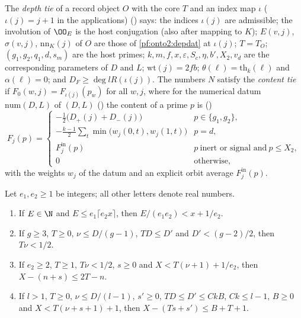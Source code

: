 \begin{definition}\label{pf:onto2:runtie}
The \emph{depth tie} of a record object $O$ with the core $T$ and an index map $\iota$ ($\iota(j)=j+1$ in the applications)
() says: the indices $\iota(j)$ are admissible; the involution of $\OO_E$ is the host
conjugation (also after mapping to $K$); $E(v,j)$, $\sigma(v,j)$, $\mathrm{nn}_K(j)$ of $O$ are those of \cref{pf:onto2:depdat} at
$\iota(j)$; $T=T_O$; $(g_1,g_2,q_1,d,s_m)$ are the host primes; $k,m,f,x,\varepsilon,S_c,\eta,b',X_2,v_d$ are the corresponding
parameters of $D$ and $L$; $\mathrm{wt}(j)=2fb$; $\theta(\ell)=\mathrm{th}_k(\ell)$ and $\alpha(\ell)=0$; and $D_F\ge\deg lR(\iota(j))$.
The numbers $N$ satisfy the \emph{content tie} if $F_0(w,j)=F_{\iota(j)}(p_w)$ for all $w,j$, where for the numerical datum
$\mathrm{num}(D,L)$ of $(D,L)$ () the content of a prime $p$ is
()
\[
F_j(p)=\begin{cases}
-\tfrac12\bigl(D_+(j)+D_-(j)\bigr)&p\in\{g_1,g_2\},\\
-\tfrac{k-1}{2}\sum_{t}\min\bigl(w_j(0,t),w_j(1,t)\bigr)&p=d,\\
F^{\mathrm{in}}_j(p)&p\ \text{inert or signal and}\ p\le X_2,\\
0&\text{otherwise},
\end{cases}
\]
with the weights $w_j$ of the datum and an explicit orbit average $F^{\mathrm{in}}_j(p)$.
\end{definition}

\begin{lemma}\label{pf:onto2:round}
Let $e_1,e_2\ge1$ be integers; all other letters denote real numbers.
\begin{enumerate}[label=(\roman*)]
\item If $E\in\N$ and $E\le e_1\lceil e_2x\rceil$, then $E/(e_1e_2)<x+1/e_2$.
\item If $g\ge3$, $T\ge0$, $\nu\le D/(g-1)$, $TD\le D'$ and $D'<(g-2)/2$, then $T\nu<1/2$.
\item If $e_2\ge2$, $T\ge1$, $T\nu<1/2$, $s\ge0$ and $X<T(\nu+1)+1/e_2$, then $X-(n+s)\le2T-n$.
\item If $l>1$, $T\ge0$, $\nu\le D/(l-1)$, $s'\ge0$, $TD\le D'\le CkB$, $Ck\le l-1$, $B\ge0$ and $X<T(\nu+s+1)+1$, then
  $X-(Ts+s')\le B+T+1$.
\end{enumerate}
\end{lemma}

